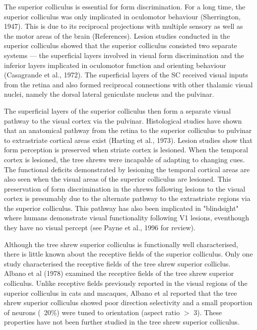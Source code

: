 \documentclass [12pt]{report}
\begin{document}
The superior colliculus is essential for form discrimination. For a long time, the superior colliculus was only implicated in oculomotor behaviour (Sherrington, 1947). This is due to its reciprocal projections with multiple sensory as well as the motor areas of the brain (References). Lesion studies conducted in the superior colliculus  showed that the superior colliculus consisted two separate systems --- the superficial layers involved in visual form discrimination and the inferior layers implicated in oculomotor function and orienting behaviour (Casagrande et al., 1972). The superficial layers of the SC received visual inputs from the retina and also formed reciprocal connections with other thalamic visual nuclei, namely the dorsal lateral geniculate nucleus and the pulvinar.

The superficial layers of the superior colliculus then form a separate visual pathway to the visual cortex via the pulvinar. Histological studies have shown that an anatomical pathway from the retina to the superior colliculus to pulvinar to extrastriate cortical areas exist (Harting et al., 1973). Lesion studies show that form perception is preserved when striate cortex is lesioned. When the temporal cortex is lesioned, the tree shrews were incapable of adapting to changing cues. The functional deficits demonstrated by lesioning the temporal cortical areas are also seen when the visual areas of the superior colliculus are lesioned. This preservation of form discrimination in the shrews following lesions to the visual cortex is presumably due to the alternate pathway to the extrastriate regions via the superior colliculus. This pathway has also been implicated in "blindsight" where humans demonstrate visual functionality following V1 lesions, eventhough they have no visual percept (see Payne et al., 1996 for review).

Although the tree shrew superior colliculus is functionally well characterised, there is little known about the receptive fields of the superior colliculus. Only one study characterised the receptive fields of the tree shrew superior colliclus. Albano et al (1978) examined the receptive fields of the tree shrew superior colliculus. Unlike receptive fields previously reported in the visual regions of the superior colliculus in cats and macaques, Albano et al reported that the tree shrew superior colliculus showed poor direction selectivity and a small proportion of neurons (~20\%) were tuned to orientation (aspect ratio $>$ 3). These properties have not been further studied in the tree shrew superior colliculus.
\end{document}
